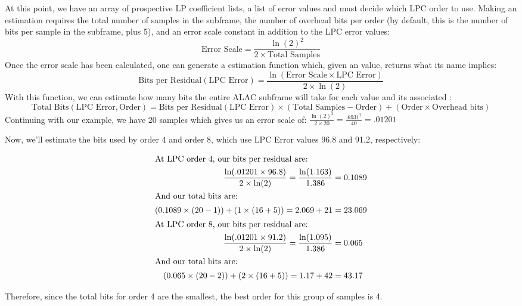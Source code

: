 At this point, we have an array of prospective LP coefficient lists,
a list of error values and must decide which LPC order to use.
Making an estimation requires the total number of samples
in the subframe, the number of overhead bits per order (by default,
this is the number of bits per sample in the subframe, plus 5),
and an error scale constant in addition to the LPC error values:
\begin{equation}
\text{Error Scale} = \frac{\ln(2) ^ 2}{2 \times \text{Total Samples}}
\end{equation}
\noindent
Once the error scale has been calculated, one can generate a
 estimation function which, given an 
value, returns what its name implies:
\begin{equation}
\text{Bits per Residual}(\text{LPC Error}) = \frac{\ln(\text{Error Scale} \times \text{LPC Error})}{2 \times \ln(2)}
\end{equation}
With this function, we can estimate how many bits the entire ALAC subframe
will take for each  value and its associated :
{
\begin{equation*}
\text{Total Bits}(\text{LPC Error},\text{Order}) = \text{Bits per Residual}(\text{LPC Error}) \times (\text{Total Samples} - \text{Order}) + (\text{Order} \times \text{Overhead bits})
\end{equation*}
}
Continuing with our example, we have 20 samples which gives us an
error scale of: $\frac{{\ln(2) ^ 2}}{2 \times 20} = \frac{.6931 ^ 2}{40} = .01201$

Now, we'll estimate the bits used by order 4 and order 8,
which use LPC Error values 96.8 and 91.2, respectively:

\begin{align*}
\intertext{At LPC order 4, our bits per residual are:}
\frac{\ln(.01201 \times 96.8)}{2 \times \ln (2)} = \frac{\ln(1.163)}{1.386} &= 0.1089 \\
\intertext{And our total bits are:}
(0.1089 \times (20 - 1)) + (1 \times (16 + 5)) = 2.069 + 21 &= 23.069 \\
\intertext{At LPC order 8, our bits per residual are:}
\frac{\ln(.01201 \times 91.2)}{2 \times \ln(2)} = \frac{\ln(1.095)}{1.386} &= 0.065 \\
\intertext{And our total bits are:}
(0.065 \times (20 - 2)) + (2 \times (16 + 5)) = 1.17 + 42 &= 43.17 \\
\end{align*}
\par
\noindent
Therefore, since the total bits for order 4 are the smallest,
the best order for this group of samples is 4.

